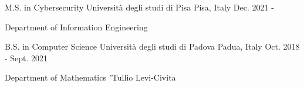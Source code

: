 

\begin{cventries}


   \cventry
	{M.S. in Cybersecurity} %
	{Università degli studi di Pisa} %
	{Pisa, Italy} %
	{Dec. 2021 - } %
	{
		\begin{cvitems}
			\item{Department of Information Engineering}
		\end{cvitems}
	}

  \cventry
    {B.S. in Computer Science} %
    {Università degli studi di Padova} %
    {Padua, Italy} %
    {Oct. 2018 - Sept. 2021} %
    {
		\begin{cvitems} %
			\item{Department of Mathematics "Tullio Levi-Civita}
		\end{cvitems}
    }

\end{cventries}
